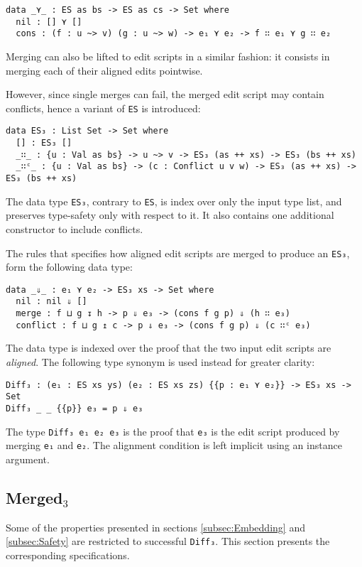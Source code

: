 \documentclass[../Thesis.tex]{subfiles}
\begin{document}
\begin{verbatim}
data _⋎_ : ES as bs -> ES as cs -> Set where
  nil : [] ⋎ []
  cons : (f : u ~> v) (g : u ~> w) -> e₁ ⋎ e₂ -> f ∷ e₁ ⋎ g ∷ e₂ 
\end{verbatim}

	Merging can also be lifted to edit scripts in a similar fashion: it
	consists in merging each of their aligned edits pointwise.
	
	However, since single merges can fail, the merged edit
	script may contain conflicts, hence a variant of \texttt{ES} 
	is introduced:
	\begin{verbatim}
data ES₃ : List Set -> Set where
  [] : ES₃ []
  _∷_ : {u : Val as bs} -> u ~> v -> ES₃ (as ++ xs) -> ES₃ (bs ++ xs)
  _∷ᶜ_ : {u : Val as bs} -> (c : Conflict u v w) -> ES₃ (as ++ xs) -> ES₃ (bs ++ xs)
	\end{verbatim}
	
	The data type \texttt{ES₃}, contrary to \texttt{ES}, is index over only 
	the input type list, and preserves type-safety only with respect to it.
	It also contains one additional constructor to include conflicts.
	
	The rules that specifies how aligned edit scripts are merged to produce
	an \texttt{ES₃}, form the following data type:
	
\begin{verbatim}
data _⇓_ : e₁ ⋎ e₂ -> ES₃ xs -> Set where
  nil : nil ⇓ []
  merge : f ⊔ g ↧ h -> p ⇓ e₃ -> (cons f g p) ⇓ (h ∷ e₃)
  conflict : f ⊔ g ↥ c -> p ⇓ e₃ -> (cons f g p) ⇓ (c ∷ᶜ e₃)
\end{verbatim}

	The data type is indexed over the proof that the two input edit scripts are
	\emph{aligned}.
	The following type synonym is used instead for greater clarity:
\begin{verbatim}
Diff₃ : (e₁ : ES xs ys) (e₂ : ES xs zs) {{p : e₁ ⋎ e₂}} -> ES₃ xs -> Set
Diff₃ _ _ {{p}} e₃ = p ⇓ e₃
\end{verbatim}
	The type \texttt{Diff₃ e₁ e₂ e₃} is the proof that \texttt{e₃} is the edit script
	produced by merging \texttt{e₁} and \texttt{e₂}. The alignment condition is 
	left implicit using	 an instance argument.	
	
	\subsection{Merged$_3$}
	\label{subsec:Merged3}
	Some of the properties presented in sections \ref{subsec:Embedding} and 
	\ref{subsec:Safety} are restricted to successful \texttt{Diff₃}.
	This section presents the corresponding specifications.
\end{document}
